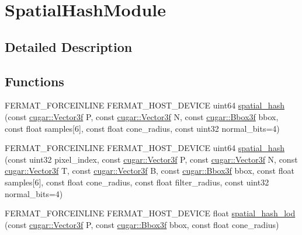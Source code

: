 \hypertarget{group___spatial_hash_module}{}\section{Spatial\+Hash\+Module}
\label{group___spatial_hash_module}


\subsection{Detailed Description}
\subsection*{Functions}
\begin{DoxyCompactItemize}
\item 
F\+E\+R\+M\+A\+T\+\_\+\+F\+O\+R\+C\+E\+I\+N\+L\+I\+NE F\+E\+R\+M\+A\+T\+\_\+\+H\+O\+S\+T\+\_\+\+D\+E\+V\+I\+CE uint64 \hyperlink{group___spatial_hash_module_ga04c40211588f9601e16bc99d3bef70ed}{spatial\+\_\+hash} (const \hyperlink{structcugar_1_1_vector}{cugar\+::\+Vector3f} P, const \hyperlink{structcugar_1_1_vector}{cugar\+::\+Vector3f} N, const \hyperlink{structcugar_1_1_bbox}{cugar\+::\+Bbox3f} bbox, const float samples\mbox{[}6\mbox{]}, const float cone\+\_\+radius, const uint32 normal\+\_\+bits=4)
\item 
F\+E\+R\+M\+A\+T\+\_\+\+F\+O\+R\+C\+E\+I\+N\+L\+I\+NE F\+E\+R\+M\+A\+T\+\_\+\+H\+O\+S\+T\+\_\+\+D\+E\+V\+I\+CE uint64 \hyperlink{group___spatial_hash_module_ga2513a4c97931956f4af57ea0e56a6829}{spatial\+\_\+hash} (const uint32 pixel\+\_\+index, const \hyperlink{structcugar_1_1_vector}{cugar\+::\+Vector3f} P, const \hyperlink{structcugar_1_1_vector}{cugar\+::\+Vector3f} N, const \hyperlink{structcugar_1_1_vector}{cugar\+::\+Vector3f} T, const \hyperlink{structcugar_1_1_vector}{cugar\+::\+Vector3f} B, const \hyperlink{structcugar_1_1_bbox}{cugar\+::\+Bbox3f} bbox, const float samples\mbox{[}6\mbox{]}, const float cone\+\_\+radius, const float filter\+\_\+radius, const uint32 normal\+\_\+bits=4)
\item 
F\+E\+R\+M\+A\+T\+\_\+\+F\+O\+R\+C\+E\+I\+N\+L\+I\+NE F\+E\+R\+M\+A\+T\+\_\+\+H\+O\+S\+T\+\_\+\+D\+E\+V\+I\+CE float \hyperlink{group___spatial_hash_module_gac8381b402e3663f4c235952ca96a5391}{spatial\+\_\+hash\+\_\+lod} (const \hyperlink{structcugar_1_1_vector}{cugar\+::\+Vector3f} P, const \hyperlink{structcugar_1_1_bbox}{cugar\+::\+Bbox3f} bbox, const float cone\+\_\+radius)
\end{DoxyCompactItemize}


